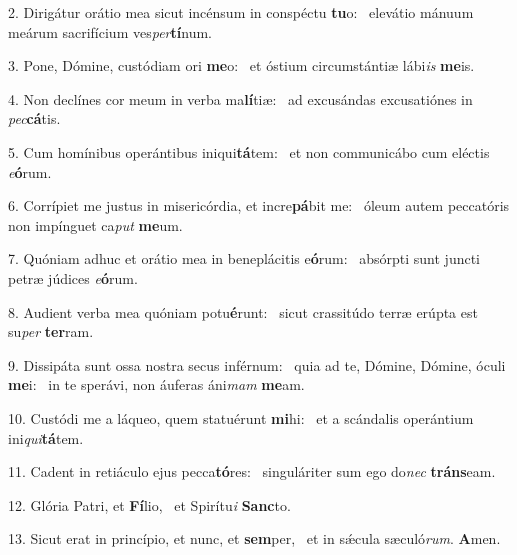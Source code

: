 2. Dirigátur orátio mea sicut incénsum in conspéctu \textbf{tu}o: \ast\  elevátio mánuum meárum sacrifícium ves\textit{per}\textbf{tí}num.\

3. Pone, Dómine, custódiam ori \textbf{me}o: \ast\  et óstium circumstántiæ lábi\textit{is} \textbf{me}is.\

4. Non declínes cor meum in verba ma\textbf{lí}tiæ: \ast\  ad excusándas excusatiónes in \textit{pec}\textbf{cá}tis.\

5. Cum homínibus operántibus iniqui\textbf{tá}tem: \ast\  et non communicábo cum eléctis \textit{e}\textbf{ó}rum.\

6. Corrípiet me justus in misericórdia, et incre\textbf{pá}bit me: \ast\  óleum autem peccatóris non impínguet ca\textit{put} \textbf{me}um.\

7. Quóniam adhuc et orátio mea in beneplácitis e\textbf{ó}rum: \ast\  absórpti sunt juncti petræ júdices \textit{e}\textbf{ó}rum.\

8. Audient verba mea quóniam potu\textbf{é}runt: \ast\  sicut crassitúdo terræ erúpta est su\textit{per} \textbf{ter}ram.\

9. Dissipáta sunt ossa nostra secus inférnum: \dag\  quia ad te, Dómine, Dómine, óculi \textbf{me}i: \ast\  in te sperávi, non áuferas áni\textit{mam} \textbf{me}am.\

10. Custódi me a láqueo, quem statuérunt \textbf{mi}hi: \ast\  et a scándalis operántium ini\textit{qui}\textbf{tá}tem.\

11. Cadent in retiáculo ejus pecca\textbf{tó}res: \ast\  singuláriter sum ego do\textit{nec} \textbf{tráns}eam.\

12. Glória Patri, et \textbf{Fí}lio, \ast\  et Spirítu\textit{i} \textbf{Sanc}to.\

13. Sicut erat in princípio, et nunc, et \textbf{sem}per, \ast\  et in sǽcula sæculó\textit{rum}. \textbf{A}men.\

